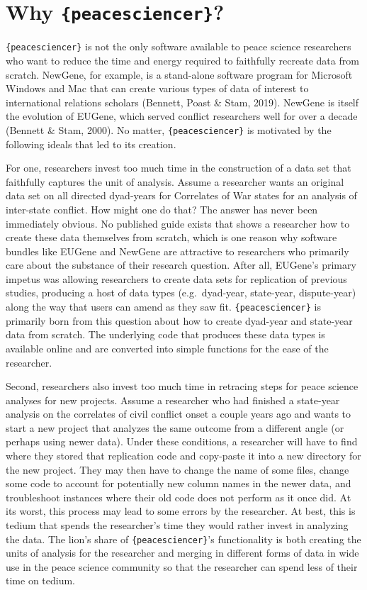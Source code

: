 \documentclass[
  11pt,
]{article}
\begin{document}
\hypertarget{why-peacesciencer}{%
\section{\texorpdfstring{Why \texttt{\{peacesciencer\}}?}{Why \{peacesciencer\}?}}\label{why-peacesciencer}}

\texttt{\{peacesciencer\}} is not the only software available to peace science researchers who want to reduce the time and energy required to faithfully recreate data from scratch. NewGene, for example, is a stand-alone software program for Microsoft Windows and Mac that can create various types of data of interest to international relations scholars (Bennett, Poast \& Stam, 2019). NewGene is itself the evolution of EUGene, which served conflict researchers well for over a decade (Bennett \& Stam, 2000). No matter, \texttt{\{peacesciencer\}} is motivated by the following ideals that led to its creation.

For one, researchers invest too much time in the construction of a data set that faithfully captures the unit of analysis. Assume a researcher wants an original data set on all directed dyad-years for Correlates of War states for an analysis of inter-state conflict. How might one do that? The answer has never been immediately obvious. No published guide exists that shows a researcher how to create these data themselves from scratch, which is one reason why software bundles like EUGene and NewGene are attractive to researchers who primarily care about the substance of their research question. After all, EUGene's primary impetus was allowing researchers to create data sets for replication of previous studies, producing a host of data types (e.g.~dyad-year, state-year, dispute-year) along the way that users can amend as they saw fit. \texttt{\{peacesciencer\}} is primarily born from this question about how to create dyad-year and state-year data from scratch. The underlying code that produces these data types is available online and are converted into simple functions for the ease of the researcher.

Second, researchers also invest too much time in retracing steps for peace science analyses for new projects. Assume a researcher who had finished a state-year analysis on the correlates of civil conflict onset a couple years ago and wants to start a new project that analyzes the same outcome from a different angle (or perhaps using newer data). Under these conditions, a researcher will have to find where they stored that replication code and copy-paste it into a new directory for the new project. They may then have to change the name of some files, change some code to account for potentially new column names in the newer data, and troubleshoot instances where their old code does not perform as it once did. At its worst, this process may lead to some errors by the researcher. At best, this is tedium that spends the researcher's time they would rather invest in analyzing the data. The lion's share of \texttt{\{peacesciencer\}}'s functionality is both creating the units of analysis for the researcher and merging in different forms of data in wide use in the peace science community so that the researcher can spend less of their time on tedium.
\end{document}

